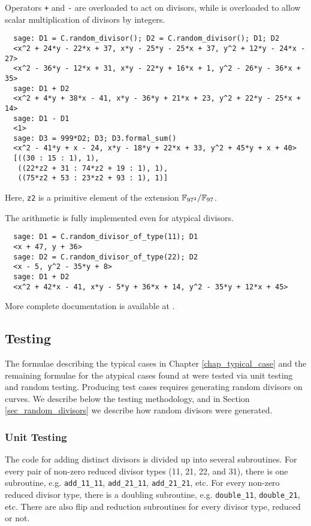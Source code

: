 Operators {\tt +} and {\tt -} are overloaded to act on divisors,
while {\tt *} is overloaded to allow scalar multiplication of divisors by integers.
\begin{verbatim}
  sage: D1 = C.random_divisor(); D2 = C.random_divisor(); D1; D2
  <x^2 + 24*y - 22*x + 37, x*y - 25*y - 25*x + 37, y^2 + 12*y - 24*x - 27>
  <x^2 - 36*y - 12*x + 31, x*y - 22*y + 16*x + 1, y^2 - 26*y - 36*x + 35>
  sage: D1 + D2
  <x^2 + 4*y + 38*x - 41, x*y - 36*y + 21*x + 23, y^2 + 22*y - 25*x + 14>
  sage: D1 - D1
  <1>
  sage: D3 = 999*D2; D3; D3.formal_sum()
  <x^2 - 41*y + x - 24, x*y - 18*y + 22*x + 33, y^2 + 45*y + x + 40>
  [((30 : 15 : 1), 1),
   ((22*z2 + 31 : 74*z2 + 19 : 1), 1),
   ((75*z2 + 53 : 23*z2 + 93 : 1), 1)]
\end{verbatim}
Here, {\tt z2} is a primitive element of the extension $\mathbb{F}_{97^2}/\mathbb{F}_{97}$.

The arithmetic is fully implemented even for atypical divisors.
\begin{verbatim}
  sage: D1 = C.random_divisor_of_type(11); D1
  <x + 47, y + 36>
  sage: D2 = C.random_divisor_of_type(22); D2
  <x - 5, y^2 - 35*y + 8>
  sage: D1 + D2
  <x^2 + 42*x - 41, x*y - 5*y + 36*x + 14, y^2 - 35*y + 12*x + 45>
\end{verbatim}
More complete documentation is available at \cite{github}.




\subsection{Testing}

The formulae describing the typical cases in Chapter \ref{chap_typical_case}
and the remaining formulae for the atypical cases found at \cite{github}
were tested via unit testing and random testing.
Producing test cases requires generating random divisors on curves.
We describe below the testing methodology,
and in Section \ref{sec_random_divisors} we describe how random divisors were generated.



\subsubsection{Unit Testing}

The code for adding distinct divisors is divided up into several subroutines.
For every pair of non-zero reduced divisor types (11, 21, 22, and 31),
there is one subroutine,
e.g. {\tt add\_11\_11}, {\tt add\_21\_11}, {\tt add\_21\_21}, etc.
For every non-zero reduced divisor type, there is a doubling subroutine,
e.g. {\tt double\_11}, {\tt double\_21}, etc.
There are also flip and reduction subroutines for every divisor type, reduced or not.

